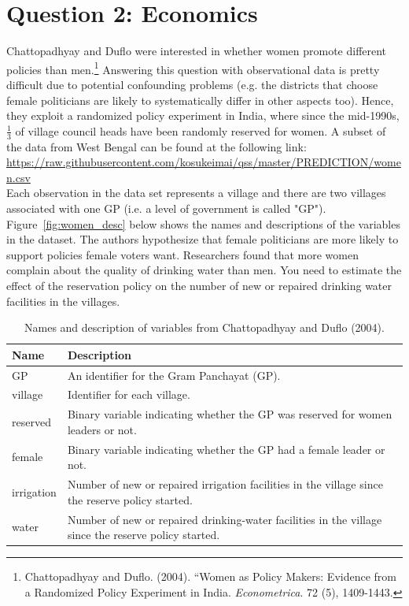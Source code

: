 \documentclass[12pt,letterpaper]{article}
\begin{document}
\section*{Question 2: Economics}
Chattopadhyay and Duflo were interested in whether women promote different policies than men.\footnote{Chattopadhyay and Duflo. (2004). ``Women as Policy Makers: Evidence from a Randomized Policy Experiment in India. \textit{Econometrica}. 72 (5), 1409-1443.} Answering this question with observational data is pretty difficult due to potential confounding problems (e.g. the districts that choose female politicians are likely to systematically differ in other aspects too). Hence, they exploit a randomized policy experiment in India, where since the mid-1990s, $\frac{1}{3}$ of village council heads have been randomly reserved for women. A subset of the data from West Bengal can be found at the following link: \url{https://raw.githubusercontent.com/kosukeimai/qss/master/PREDICTION/women.csv}\\

\noindent Each observation in the data set represents a village and there are two villages associated with one GP (i.e. a level of government is called "GP"). Figure~\ref{fig:women_desc} below shows the names and descriptions of the variables in the dataset. The authors hypothesize that female politicians are more likely to support policies female voters want. Researchers found that more women complain about the quality of drinking water than men. You need to estimate the effect of the reservation policy on the number of new or repaired drinking water facilities in the villages.
\vspace{.5cm}

\begin{table}[h!]
	\centering
	\caption{\footnotesize Names and description of variables from Chattopadhyay and Duflo (2004).}
	\label{tab:women_desc}
	\begin{tabularx}{\textwidth}{lX}
		\toprule
		\textbf{Name} & \textbf{Description} \\
		\midrule
		GP & An identifier for the Gram Panchayat (GP). \\
		village & Identifier for each village. \\
		reserved & Binary variable indicating whether the GP was reserved for women leaders or not. \\
		female & Binary variable indicating whether the GP had a female leader or not. \\
		irrigation & Number of new or repaired irrigation facilities in the village since the reserve policy started. \\
		water & Number of new or repaired drinking-water facilities in the village since the reserve policy started. \\
		\bottomrule
	\end{tabularx}
\end{table}
\end{document}
